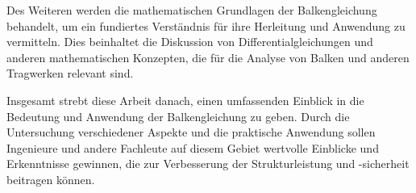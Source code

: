 Des Weiteren werden die mathematischen Grundlagen der Balkengleichung behandelt, um ein fundiertes Verständnis für ihre Herleitung und Anwendung zu vermitteln. Dies beinhaltet die Diskussion von Differentialgleichungen und anderen mathematischen Konzepten, die für die Analyse von Balken und anderen Tragwerken relevant sind.

Insgesamt strebt diese Arbeit danach, einen umfassenden Einblick in die Bedeutung und Anwendung der Balkengleichung zu geben. Durch die Untersuchung verschiedener Aspekte und die praktische Anwendung sollen Ingenieure und andere Fachleute auf diesem Gebiet wertvolle Einblicke und Erkenntnisse gewinnen, die zur Verbesserung der Strukturleistung und -sicherheit beitragen können.

